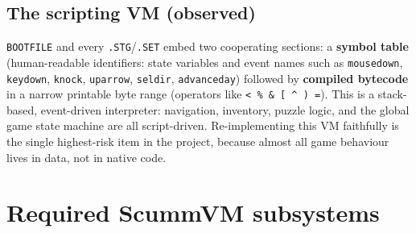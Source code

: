 \documentclass[11pt]{article}
\newcommand{\code}[1]{\texttt{#1}}
\begin{document}
\subsection{The scripting VM (observed)}
\code{BOOTFILE} and every \code{.STG}/\code{.SET} embed two cooperating sections:
a \textbf{symbol table} (human-readable identifiers: state variables and event
names such as \code{mousedown}, \code{keydown}, \code{knock}, \code{uparrow},
\code{seldir}, \code{advanceday}) followed by \textbf{compiled bytecode} in a
narrow printable byte range (operators like \code{< \% \& [ \^{} ) =}). This is a
stack-based, event-driven interpreter: navigation, inventory, puzzle logic, and
the global game state machine are all script-driven. Re-implementing this VM
faithfully is the single highest-risk item in the project, because almost all
game behaviour lives in data, not in native code.

\section{Required ScummVM subsystems}
\end{document}

